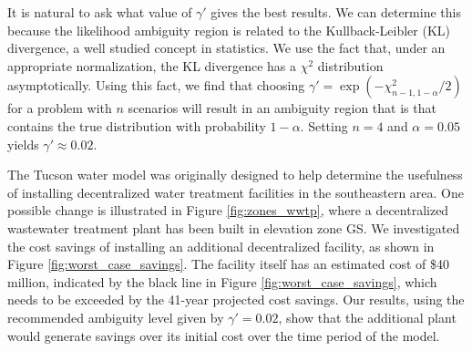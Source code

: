 \documentclass[12pt]{amsart}
\begin{document}
It is natural to ask what value of $\gamma'$ gives the best results.
We can determine this because the likelihood ambiguity region is related to the Kullback-Leibler (KL) divergence, a well studied concept in statistics.
We use the fact that, under an appropriate normalization, the KL divergence has a $\chi^2$ distribution asymptotically.
Using this fact, we find that choosing $\gamma' = \exp(-\chi^2_{n-1,1-\alpha}/2)$ for a problem with $n$ scenarios will result in an ambiguity region that is that contains the true distribution with probability $1-\alpha$.
Setting $n = 4$ and $\alpha = 0.05$ yields $\gamma' \approx 0.02$.

The Tucson water model was originally designed to help determine the usefulness of installing decentralized water treatment facilities in the southeastern area.
One possible change is illustrated in Figure \ref{fig:zones_wwtp}, where a decentralized wastewater treatment plant has been built in elevation zone GS.
We investigated the cost savings of installing an additional decentralized facility, as shown in Figure \ref{fig:worst_case_savings}.
The facility itself has an estimated cost of \$40 million, indicated by the black line in Figure \ref{fig:worst_case_savings}, which needs to be exceeded by the 41-year projected cost savings.
Our results, using the recommended ambiguity level given by $\gamma' = 0.02$, show that the additional plant would generate savings over its initial cost over the time period of the model.

\end{document}
